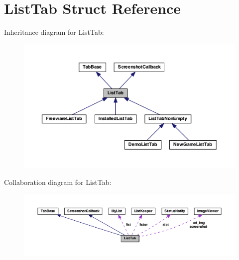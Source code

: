 \hypertarget{struct_list_tab}{\section{List\-Tab Struct Reference}
\label{struct_list_tab}
}


Inheritance diagram for List\-Tab\-:
\nopagebreak
\begin{figure}[H]
\begin{center}
\leavevmode
\includegraphics[width=350pt]{struct_list_tab__inherit__graph}
\end{center}
\end{figure}


Collaboration diagram for List\-Tab\-:
\nopagebreak
\begin{figure}[H]
\begin{center}
\leavevmode
\includegraphics[width=350pt]{struct_list_tab__coll__graph}
\end{center}
\end{figure}
